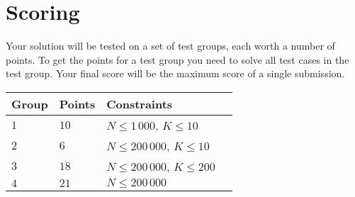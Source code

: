 \section*{Scoring}
Your solution will be tested on a set of test groups, each worth a number of points.
To get the points for a test group you need to solve all test cases in the test group.
Your final score will be the maximum score of a single submission.

\noindent
\begin{tabular}{| l | l | l | l |}
\hline
Group & Points & Constraints \\ \hline
$1$   & $10$   & $N \le 1\,000$, $K \le 10$ \\ \hline
$2$   & $6$    & $N \le 200\,000$, $K \le 10$ \\ \hline
$3$   & $18$   & $N \le 200\,000$, $K \le 200$ \\ \hline
$4$   & $21$   & $N \le 200\,000$ \\ \hline
\end{tabular}
